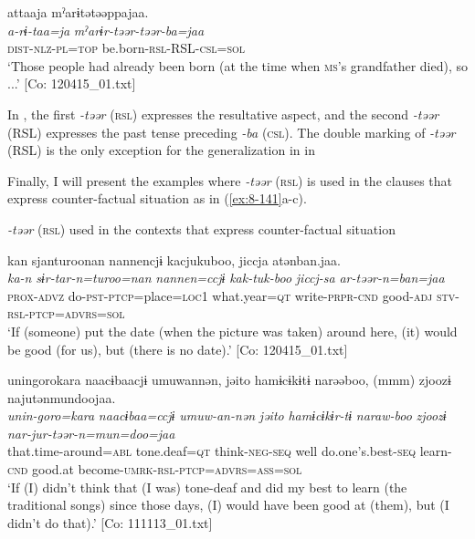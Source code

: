  {\TM}
\glll  attaaja  mˀarɨtətəəppajaa.\\
\textit{a-rɨ-taa=ja}  \textit{mˀarɨr-təər-təər-ba=jaa}\\
    \textsc{dist}-\textsc{nlz}-\textsc{pl}=\textsc{top}  be.born-\textsc{rsl}-RSL-\textsc{csl}=\textsc{sol}\\
\glt ‘Those people had already been born (at the time when \textsc{ms}’s grandfather died), so ...’ [Co: 120415\_01.txt]
\z

In , the first \textit{-təər} (\textsc{rsl}) expresses the resultative aspect, and the second \textit{-təər} (RSL) expresses the past tense preceding \textit{-ba} (\textsc{csl}). The double marking of \textit{-təər} (RSL) is the only exception for the generalization in  in 

  Finally, I will present the examples where \textit{-təər} (\textsc{rsl}) is used in the clauses that express counter-factual situation as in (\ref{ex:8-141}a-c).

\ea\label{ex:8-141}
  \textit{-təər} (\textsc{rsl}) used in the contexts that express counter-factual situation

\ea
{\TM}
\glll  kan  sjanturoonan  {\textbar}nannen{\textbar}cjɨ  kacjukuboo,      jiccja  atənban.jaa.  \\
\textit{ka-n}  \textit{sɨr-tar-n=turoo=nan}  \textit{nannen=ccjɨ}  \textit{kak-tuk-boo}      \textit{jiccj-sa}  \textit{ar-təər-n=ban=jaa}\\
\textsc{prox}-\textsc{advz}  do-\textsc{pst}-\textsc{ptcp}=place=\textsc{loc1}  what.year=\textsc{qt}  write-\textsc{prpr}-\textsc{cnd}  good-\textsc{adj}  \textsc{stv}-\textsc{rsl}-\textsc{ptcp}=\textsc{advrs}=\textsc{sol}\\
\glt ‘If (someone) put the date (when the picture was taken) around here, (it) would be good (for us), but (there is no date).’ [Co: 120415\_01.txt]

\ex
{\TM}
\glll  unin{\textbar}goro{\textbar}kara  naacɨbaacjɨ  umuwannən,  jəito  hamɨcɨkɨtɨ      narəəboo,  (mmm)  zjoozɨ  najutənmundoojaa.\\
\textit{unin-goro=kara}  \textit{naacɨbaa=ccjɨ}  \textit{umuw-an-nən}  \textit{jəito}  \textit{hamɨcɨkɨr-tɨ}      \textit{naraw-boo}    \textit{zjoozɨ}  \textit{nar-jur-təər-n=mun=doo=jaa}\\
that.time-around=\textsc{abl}  tone.deaf=\textsc{qt}  think-\textsc{neg}-\textsc{seq}  well  do.one’s.best-\textsc{seq}  learn-\textsc{cnd}    good.at  become-\textsc{umrk}-\textsc{rsl}-\textsc{ptcp}=\textsc{advrs}=\textsc{ass}=\textsc{sol}\\
\glt ‘If (I) didn’t think that (I was) tone-deaf and did my best to learn (the traditional songs) since those days, (I) would have been good at (them), but (I didn’t do that).’ [Co: 111113\_01.txt]

